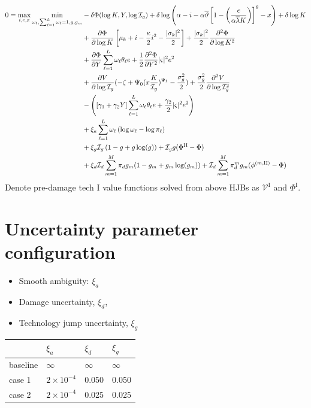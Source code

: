 \documentclass[11pt]{article}
\begin{document}
	\begin{align*} 
		0 = \max_{i,e,x} \min_{\omega_\ell, \sum_{\ell = 1}^L \omega_\ell = 1, g, g_m } &   - \delta \Phi(\log K,Y, \log \mathcal{I}_g) +  \delta \log \left( \alpha - i -  \alpha \overline{\vartheta} \left[ 1 - \left(\frac {e} { \alpha \overline\lambda K} \right) \right]^\theta  - x \right) + \delta\log K \cr 
		& + \frac {\partial \Phi}{\partial \log K} 
		\left[ \mu_k    + i   -
		{\frac { \kappa} 2} i^2  -  \frac  {|\sigma_k|^2}  2\right]  + \frac {|\sigma_k|^2} 2  \frac {\partial^2 \Phi}{\partial \log K^2} \cr
		& + \frac {\partial \Phi}{\partial Y}  \sum_{\ell=1}^L \omega_\ell  \theta_\ell {e} + {\frac 1 2} \frac {\partial^2\Phi}{\partial Y^2} |\varsigma|^2 e^2  \cr
		& + \frac{\partial V}{\partial \log \mathcal{I}_g} (- \zeta + \Psi_0 (x\frac{K}{\mathcal{I}_g})^{\Psi_1} - \frac{\sigma_g^2}{2} ) + \frac{\sigma_g^2}{2}\frac{\partial^2 V}{\partial \log \mathcal{I}_g^2} \\
		& - \left( \left[ \gamma_1 + \gamma_2 Y\right]   \sum_{\ell=1}^L \omega_\ell \theta_\ell { e} + \frac {\gamma_2} {2}|\varsigma|^2  e^2 \right) \cr
		& + \xi_a \sum_{\ell = 1}^L \omega_\ell \left( \log \omega_\ell - \log \pi_\ell \right) \\
		& + \xi_g \mathcal{I}_g \left(1 - g + g  \log(g) \right) + \mathcal{I}_g g (\Phi^{\text{II}} - \Phi)\\
		&  + \xi_d \mathcal{I}_d \sum_{m=1}^M \pi_d g_m (1 - g_m + g_m \log(g_m)) + \mathcal{I}_d \sum_{m=1}^M \pi_d^m g_m (\phi^{(m, \text{II})} - \Phi)
	\end{align*} 
	Denote pre-damage tech I value functions solved from above HJBs as  $\mathcal{V}^{\text{I}}$ and $\Phi^{\text{I}}$.
	
	
	\section{Uncertainty parameter configuration}
	\begin{itemize}
		\item Smooth ambiguity: $\xi_a$
		\item Damage uncertainty, $\xi_d$,
		\item Technology jump uncertainty, $\xi_g$
	\end{itemize}
	
	\begin{table}[H]
		\centering
		\begin{tabular}{llll}
			\toprule
			& $\xi_a$ & $\xi_d$ & $\xi_g$ \\
			\midrule
			baseline & $\infty$ & $\infty$ & $\infty$\\
			case 1 & $2 \times 10^{-4}$ & 0.050 & 0.050 \\
			case 2 & $2 \times 10^{-4}$ & 0.025& 0.025\\
			\bottomrule
		\end{tabular}
	\end{table}
\end{document}
